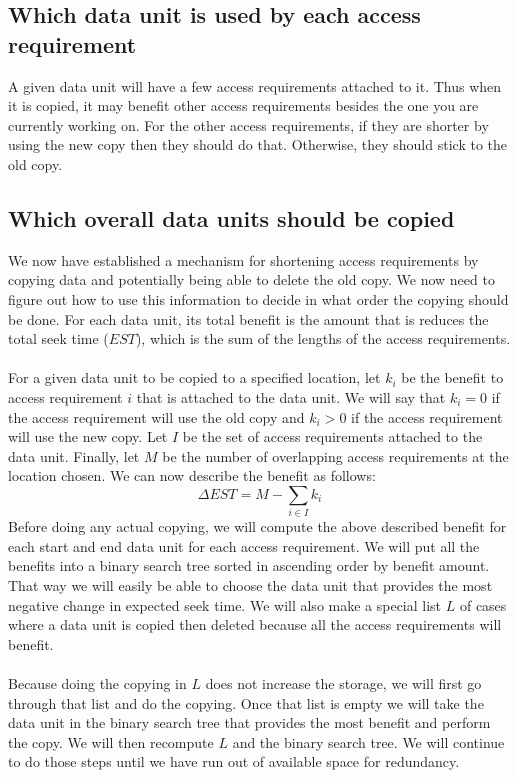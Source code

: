 \documentclass[conference]{acmsiggraph}
\begin{document}
\subsection{Which data unit is used by each access requirement}

A given data unit will have a few access requirements attached to it. Thus when it is copied, it may benefit other access requirements besides the one you are currently working on. For the other access requirements, if they are shorter by using the new copy then they should do that. Otherwise, they should stick to the old copy.

\subsection{Which overall data units should be copied}

We now have established a mechanism for shortening access requirements by copying data and potentially being able to delete the old copy. We now need to figure out how to use this information to decide in what order the copying should be done. For each data unit, its total benefit is the amount that is reduces the total seek time ($EST$), which is the sum of the lengths of the access requirements. \\
\\
For a given data unit to be copied to a specified location, let $k_i$ be the benefit to access requirement $i$ that is attached to the data unit. We will say that $k_i=0$ if the access requirement will use the old copy and $k_i>0$ if the access requirement will use the new copy. Let $I$ be the set of access requirements attached to the data unit. Finally, let $M$ be the number of overlapping access requirements at the location chosen. We can now describe the benefit as follows:
\[
\Delta EST = M - \sum_{i \in I} k_i
\]
Before doing any actual copying, we will compute the above described benefit for each start and end data unit for each access requirement. We will put all the benefits into a binary search tree sorted in ascending order by benefit amount. That way we will easily be able to choose the data unit that provides the most negative change in expected seek time. We will also make a special list $L$ of cases where a data unit is copied then deleted because all the access requirements will benefit. \\
\\
Because doing the copying in $L$ does not increase the storage, we will first go through that list and do the copying. Once that list is empty we will take the data unit in the binary search tree that provides the most benefit and perform the copy. We will then recompute $L$ and the binary search tree. We will continue to do those steps until we have run out of available space for redundancy.  
\end{document}
